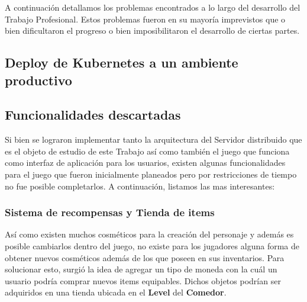 
\noindent A continuación detallamos los problemas encontrados a lo largo del desarrollo del
Trabajo Profesional. Estos problemas fueron en su mayoría imprevistos que o bien
dificultaron el progreso o bien imposibilitaron el desarrollo de ciertas partes.

\subsection{Deploy de Kubernetes a un ambiente productivo}

\subsection{Funcionalidades descartadas}

Si bien se lograron implementar tanto la arquitectura del Servidor distribuido que es el objeto
de estudio de este Trabajo así como también el juego que funciona como interfaz de aplicación
para los usuarios, existen algunas funcionalidades para el juego que fueron inicialmente
planeados pero por restricciones de tiempo no fue posible completarlos. A continuación, listamos 
las mas interesantes:

\subsubsection{Sistema de recompensas y Tienda de items}
Así como existen muchos cosméticos para la creación del personaje y además es posible cambiarlos dentro del
juego, no existe para los jugadores alguna forma de obtener nuevos cosméticos además de los que poseen en sus
inventarios. Para solucionar esto, surgió la idea de agregar un tipo de moneda con la cuál un usuario podría comprar nuevos
items equipables. Dichos objetos podrían ser adquiridos en una tienda ubicada en el \textbf{Level} del \textbf{Comedor}.

